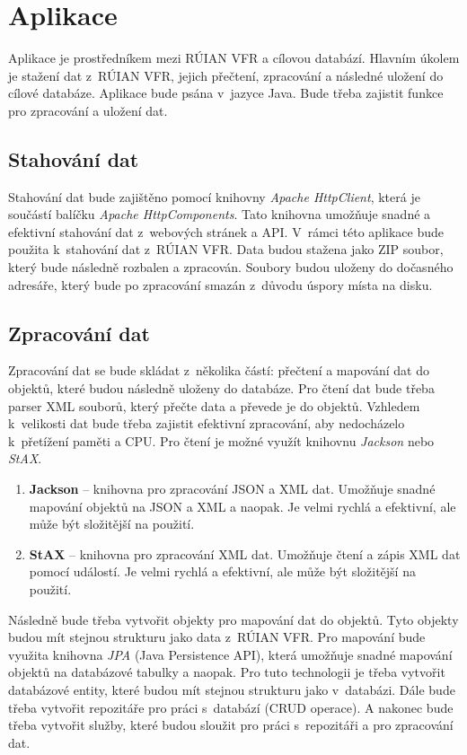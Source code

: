 \chapter{Aplikace}
Aplikace je prostředníkem mezi RÚIAN VFR a cílovou databází.
Hlavním úkolem je stažení dat z~RÚIAN VFR, jejich přečtení, zpracování a následné uložení do cílové databáze.
Aplikace bude psána v~jazyce Java. Bude třeba zajistit funkce pro zpracování a uložení dat.

\section{Stahování dat}
Stahování dat bude zajištěno pomocí knihovny \textit{Apache HttpClient}, která je 
součástí balíčku \textit{Apache HttpComponents}. 
Tato knihovna umožňuje snadné a efektivní stahování dat z~webových stránek a API. 
V~rámci této aplikace bude použita k~stahování dat z~RÚIAN VFR.
Data budou stažena jako ZIP soubor, který bude následně rozbalen a zpracován.
Soubory budou uloženy do dočasného adresáře, který bude po zpracování smazán z~důvodu úspory místa na disku.

\section{Zpracování dat}
Zpracování dat se bude skládat z~několika částí:
přečtení a mapování dat do objektů, které budou následně uloženy do databáze.
Pro čtení dat bude třeba parser XML souborů, který přečte data a převede je do objektů.
Vzhledem k~velikosti dat bude třeba zajistit efektivní zpracování, aby nedocházelo 
k~přetížení paměti a CPU.
Pro čtení je možné využít knihovnu \textit{Jackson} nebo \textit{StAX}.

\begin{enumerate}
    \item \textbf{Jackson} -- knihovna pro zpracování JSON a XML dat. Umožňuje snadné mapování 
    objektů na JSON a XML a naopak. Je velmi rychlá a efektivní, ale může být složitější na použití.
    \item \textbf{StAX} -- knihovna pro zpracování XML dat. Umožňuje 
    čtení a zápis XML dat pomocí událostí. Je velmi rychlá a efektivní, ale může být 
    složitější na použití.
\end{enumerate}

\newpage

Následně bude třeba vytvořit objekty pro mapování dat do objektů.
Tyto objekty budou mít stejnou strukturu jako data z~RÚIAN VFR.
Pro mapování bude využita knihovna \textit{JPA} (Java Persistence API), která umožňuje snadné 
mapování objektů na databázové tabulky a naopak.
Pro tuto technologii je třeba vytvořit databázové entity, které budou mít stejnou strukturu jako
v~databázi. Dále bude třeba vytvořit repozitáře pro práci s~databází (CRUD operace).
A nakonec bude třeba vytvořit služby, které budou sloužit pro práci s~repozitáři a pro zpracování dat.

